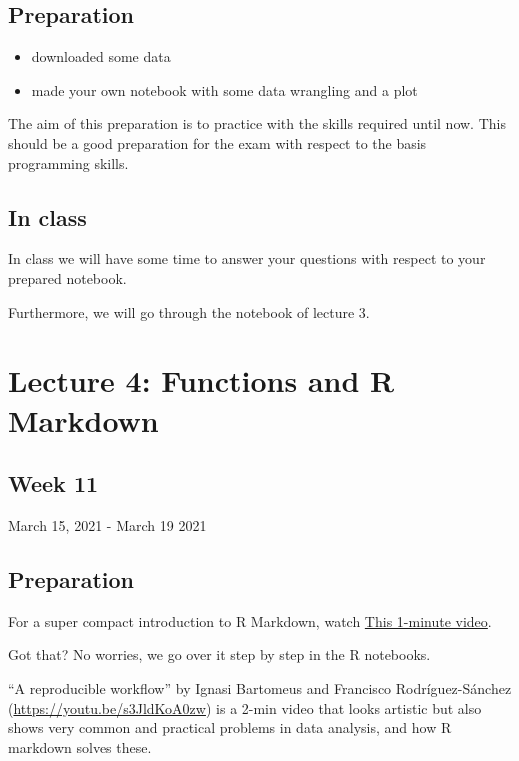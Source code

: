 \documentclass[
]{book}
\providecommand{\tightlist}{%
  \setlength{\itemsep}{0pt}\setlength{\parskip}{0pt}}
\begin{document}
\hypertarget{preparation-2}{%
\subsection{Preparation}\label{preparation-2}}

\begin{itemize}
\tightlist
\item
  downloaded some data
\item
  made your own notebook with some data wrangling and a plot
\end{itemize}

The aim of this preparation is to practice with the skills required until now. This should be a good preparation for the exam with respect to the basis programming skills.

\hypertarget{in-class-2}{%
\subsection{In class}\label{in-class-2}}

In class we will have some time to answer your questions with respect to your prepared notebook.

Furthermore, we will go through the notebook of lecture 3.

\hypertarget{lecture-4-functions-and-r-markdown}{%
\section{Lecture 4: Functions and R Markdown}\label{lecture-4-functions-and-r-markdown}}

\hypertarget{week-11}{%
\subsection{Week 11}\label{week-11}}

March 15, 2021 - March 19 2021

\hypertarget{preparation-3}{%
\subsection{Preparation}\label{preparation-3}}

For a super compact introduction to R Markdown, watch \href{https://vimeo.com/178485416}{This 1-minute video}.

Got that? No worries, we go over it step by step in the R notebooks.

``A reproducible workflow'' by Ignasi Bartomeus and Francisco Rodríguez-Sánchez (\url{https://youtu.be/s3JldKoA0zw}) is a 2-min video that looks artistic but also shows very common and practical problems in data analysis, and how R markdown solves these.
\end{document}
